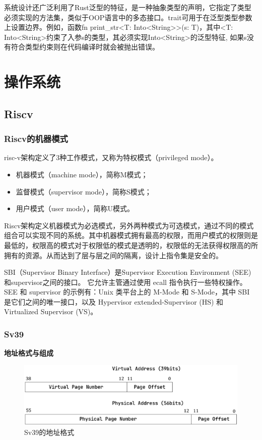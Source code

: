 系统设计还广泛利用了Rust泛型的特征，是一种抽象类型的声明，它指定了类型必须实现的方法集，类似于OOP语言中的多态接口。trait可用于在泛型类型参数上设置边界。例如，函数fn print\_str<T: Into<String>>(s: T){}，其中<T: Into<String>约束了入参s的类型，其必须实现Into<String>的泛型特征, 如果s没有符合类型约束则在代码编译时就会被抛出错误。

\section{操作系统}

\subsection{Riscv}

\subsubsection{Riscv的机器模式}

risc-v架构定义了3种工作模式，又称为特权模式（privileged mode）。

\begin{itemize}
    \item 机器模式（machine mode），简称M模式；
    \item 监督模式（supervisor mode），简称S模式；
    \item 用户模式（user mode），简称U模式。
\end{itemize}

Riscv架构定义机器模式为必选模式，另外两种模式为可选模式，通过不同的模式组合可以实现不同的系统。其中机器模式拥有最高的权限，而用户模式的权限则是最低的，权限高的模式对于权限低的模式是透明的，权限低的无法获得权限高的所拥有的资源。从而达到了层与层之间的隔离，设计上指令集是安全的。

SBI（Supervisor Binary Interface）是Supervisor Execution Environment (SEE)和supervisor之间的接口。 它允许主管通过使用 ecall 指令执行一些特权操作。 SEE 和 supervisor 的示例有：Unix 类平台上的 M-Mode 和 S-Mode，其中 SBI 是它们之间的唯一接口，以及 Hypervisor extended-Supervisor (HS) 和 Virtualized Supervisor (VS)。

\subsubsection{Sv39}

\textbf{地址格式与组成}

\begin{figure}[htb]
    \figureCapSet
    \centering
    \includegraphics[width=.8\linewidth]{figure/c2/addressstructure.png}
    \caption{Sv39的地址格式}
    \label{figure:c2addressstructure}
\end{figure}

